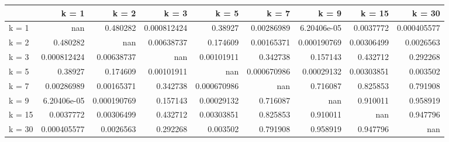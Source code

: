 \begin{tabular}{lrrrrrrrr}
\toprule
        &         k = 1 &         k = 2 &         k = 3 &         k = 5 &         k = 7 &         k = 9 &       k = 15 &        k = 30 \\
\midrule
 k = 1  & nan           &   0.480282    &   0.000812424 &   0.38927     &   0.00286989  &   6.20406e-05 &   0.0037772  &   0.000405577 \\
 k = 2  &   0.480282    & nan           &   0.00638737  &   0.174609    &   0.00165371  &   0.000190769 &   0.00306499 &   0.0026563   \\
 k = 3  &   0.000812424 &   0.00638737  & nan           &   0.00101911  &   0.342738    &   0.157143    &   0.432712   &   0.292268    \\
 k = 5  &   0.38927     &   0.174609    &   0.00101911  & nan           &   0.000670986 &   0.00029132  &   0.00303851 &   0.003502    \\
 k = 7  &   0.00286989  &   0.00165371  &   0.342738    &   0.000670986 & nan           &   0.716087    &   0.825853   &   0.791908    \\
 k = 9  &   6.20406e-05 &   0.000190769 &   0.157143    &   0.00029132  &   0.716087    & nan           &   0.910011   &   0.958919    \\
 k = 15 &   0.0037772   &   0.00306499  &   0.432712    &   0.00303851  &   0.825853    &   0.910011    & nan          &   0.947796    \\
 k = 30 &   0.000405577 &   0.0026563   &   0.292268    &   0.003502    &   0.791908    &   0.958919    &   0.947796   & nan           \\
\bottomrule
\end{tabular}